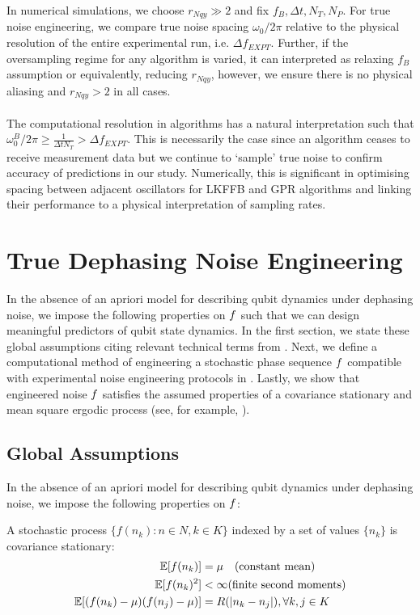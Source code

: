 In numerical simulations, we choose $r_{Nqy} \gg 2$ and fix $f_B, \Delta t, N_T, N_P$. For true noise engineering, we compare true noise spacing $\omega_0/ 2\pi$ relative to the physical resolution of the entire experimental run, i.e. $\Delta f_{EXPT}$. Further, if the oversampling regime for any algorithm is varied, it can interpreted as relaxing $f_B$ assumption or equivalently, reducing $r_{Nqy}$, however, we ensure there is no physical aliasing and $r_{Nqy}>2$ in all cases.
\\
\\
The computational resolution in algorithms has a natural interpretation such that  $\omega_0^B / 2\pi \geq \frac{1}{\Delta t N_T} > \Delta f_{EXPT}$. This is necessarily the case since an algorithm ceases to receive measurement data but we continue to `sample' true noise to confirm accuracy of predictions in our study. Numerically, this is significant in optimising spacing between adjacent oscillators for  LKFFB and GPR algorithms and linking their performance to a physical interpretation of sampling rates.  

\section{True Dephasing Noise Engineering \label{sec:app:truenoise}} 

In the absence of an apriori model for describing qubit dynamics under dephasing noise, we impose the following properties on $f$ such that we can design meaningful predictors of qubit state dynamics. In the first section, we state these global assumptions citing relevant technical terms from \cite{karlin2012first}. Next, we define a computational method of engineering a stochastic phase sequence $f$ compatible with experimental noise engineering protocols in \cite{soare2014}. Lastly, we show that engineered noise $f$ satisfies the assumed properties of a covariance stationary and mean square ergodic process (see, for example, \cite{gelb1974applied}).

\subsection{Global Assumptions}
In the absence of an apriori model for describing qubit dynamics under dephasing noise, we impose the following properties on $f$: 
\begin{azm}\label{azm:truef}
	 A stochastic process $\{f(n_k): n\in N, k \in K \}$ indexed by a set of values $\{n_k\}$ is covariance stationary:
	\begin{align}
	\mathbb{E}[f(n_k)] &= \mu \quad \text{(constant mean)} \\
	\mathbb{E}[f(n_k)^2] & < \infty \text{(finite second moments)} \\
	\mathbb{E}[(f(n_k) - \mu)(f(n_j) - \mu)] &= R(|n_k - n_j|), \forall k,j \in K  \label{azm:corrfunc}
	\end{align}
\end{azm}

